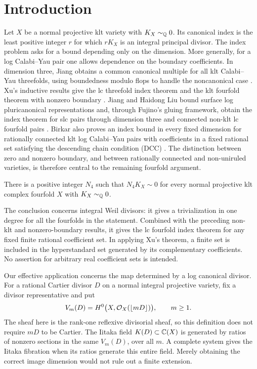 \section{Introduction}\label{sec:introduction}

Let $X$ be a normal projective klt variety with $K_X\sim_\mathbb Q0$.
Its canonical index is the least positive integer $r$ for which
$rK_X$ is an integral principal divisor. The index problem asks for
a bound depending only on the dimension. More generally, for a log
Calabi--Yau pair one allows dependence on the boundary coefficients.
In dimension three, Jiang obtains a common canonical multiple for
all klt Calabi--Yau threefolds, using boundedness modulo flops to
handle the noncanonical case \cite[Theorem~1.6 and Corollary~1.7]{Jiang2021}.
Xu's inductive results give the lc threefold index theorem and the
klt fourfold theorem with nonzero boundary
\cite[Theorems~1.13--1.14]{Xu2019}. Jiang and Haidong Liu bound
surface log pluricanonical representations and, through Fujino's
gluing framework, obtain the index theorem for slc pairs through
dimension three and connected non-klt lc fourfold pairs
\cite[Theorem~1.4 and Corollaries~1.6--1.7]{JiangLiu2021}.
Birkar also proves an index bound in every fixed dimension for
rationally connected klt log Calabi--Yau pairs with coefficients in
a fixed rational set satisfying the descending chain condition
(DCC) \cite[Corollary~1.8]{Birkar2025}.
The distinction between zero and nonzero boundary, and between
rationally connected and non-uniruled varieties, is therefore central
to the remaining fourfold argument.

\begin{theorem}\label{thm:fourfold-index-zero}
There is a positive integer $N_4$ such that $N_4K_X\sim0$ for every
normal projective klt complex fourfold $X$ with $K_X\sim_\mathbb Q0$.
\end{theorem}

The conclusion concerns integral Weil divisors: it gives a
trivialization in one degree for all the fourfolds in the statement.
Combined with the preceding non-klt and nonzero-boundary results,
it gives the lc fourfold index theorem for any fixed finite rational
coefficient set. In applying Xu's theorem, a finite set is included
in the hyperstandard set generated by its complementary coefficients.
No assertion for arbitrary real coefficient sets is intended.

Our effective application concerns the map determined by a log
canonical divisor. For a rational Cartier divisor $D$ on a normal
integral projective variety, fix a divisor representative and put
\[
 V_m(D)=H^0\bigl(X,\mathcal O_X(\lfloor mD\rfloor)\bigr),\qquad m\geq1.
\]
The sheaf here is the rank-one reflexive divisorial sheaf, so this
definition does not require $mD$ to be Cartier. The Iitaka field
$K(D)\subset\mathbb C(X)$ is generated by ratios of nonzero sections in
the same $V_m(D)$, over all $m$. A complete system gives the Iitaka
fibration when its ratios generate this entire field. Merely obtaining
the correct image dimension would not rule out a finite extension.

